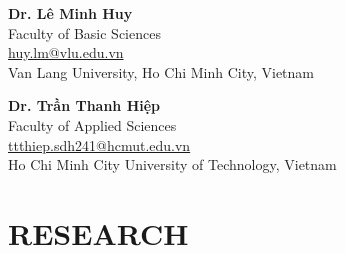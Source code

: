 \documentclass[margin]{res}
\begin{document}
\begin{resume}
\par
\textbf{Dr. Lê Minh Huy}\\
Faculty of Basic Sciences\\
\href{mailto:huy.lm@vlu.edu.vn}{huy.lm@vlu.edu.vn}\\
Van Lang University, Ho Chi Minh City, Vietnam

\par
\textbf{Dr. Trần Thanh Hiệp}\\
Faculty of Applied Sciences\\
\href{mailto:ttthiep.sdh241@hcmut.edu.vn}{ttthiep.sdh241@hcmut.edu.vn}\\
Ho Chi Minh City University of Technology, Vietnam

\section{RESEARCH}
\nocite{*}
\printbibliography[heading=none]

\end{resume}
\end{document}
